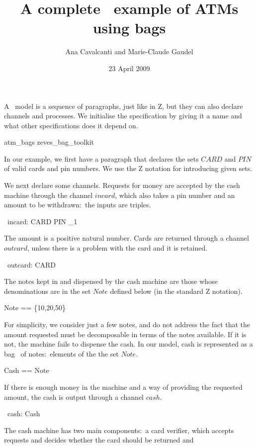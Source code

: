 \documentclass{article}
\title{A complete \Circus\ example of ATMs using bags}
\author{Ana Cavalcanti
        and
        Marie-Claude Gaudel}
\date{23 April 2009}
\begin{document}
\maketitle

A \Circus\ model is a sequence of paragraphs, just like in Z, but they can also declare channels
and processes. We initialise the specification by giving it a name and what other specifications
does it depend on.
\begin{zsection}
  \SECTION atm\_bags \parents zeves\_bag\_toolkit
\end{zsection}

In our example, we first have a paragraph that declares the sets
$CARD$ and $PIN$ of valid cards and pin numbers.  We use the Z
notation for introducing given sets.
\begin{zed}
\end{zed}
We next declare some channels.  Requests for money are accepted by
the cash machine through the channel $incard$, which also takes a pin
number and an amount to be withdrawn:~the inputs are triples.
\begin{circus}
  \circchannel\ incard: CARD \cross PIN \cross \nat_1
\end{circus}
The amount is a positive natural number.  Cards are returned through
a channel $outcard$, unless there is a problem with the card and it
is retained.
\begin{circus}
  \circchannel\ outcard: CARD
\end{circus}
The notes kept in and dispensed by the cash machine are those whose
denominations are in the set $Note$ defined below (in the standard Z
notation).
\begin{zed}
  Note == \{10,20,50\}
\end{zed}
For simplicity, we consider just a few notes, and do not address the
fact that the amount requested must be decomposable in terms of the
notes available.  If it is not, the machine fails to dispense the
cash. In our model, cash is represented as a bag~\cite{Spi92} of
notes:~elements of the the set $Note$.
\begin{zed}
  Cash == \bag Note
\end{zed}
If there is enough money in the machine and a way of providing the
requested amount, the cash is output through a channel $cash$.
\begin{circus}
  \circchannel\ cash: Cash
\end{circus}
The cash machine has two main components:~a card verifier, which
accepts requests and decides whether the card should be returned and
\end{document}
